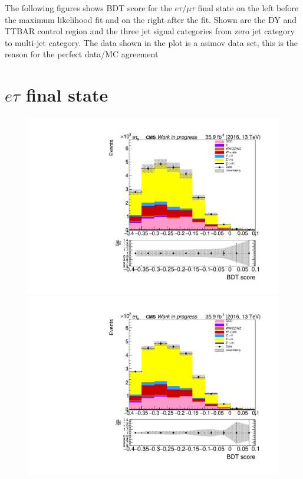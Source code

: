 \label{sec:appendix_B}

The following figures shows \gls{BDT} score for the $e\tau/\mu\tau$ final state on the left before the maximum likelihood fit and on the right after the fit. Shown are the \gls{DY} and \gls{TTBAR} control region and the three jet signal categories from zero jet category to multi-jet category. The data shown in the plot is a asimov data set, this is the reason for the perfect data/MC agreement

\section*{$e\tau$ final state}

\begin{figure}[htp]
	\begin{multicols}{2}
		\includegraphics[width=\linewidth]{plots/et/DY_CR_prefit.pdf}\par 
		\includegraphics[width=\linewidth]{plots/et/DY_CR_postfit.pdf}\par
	\end{multicols}

\end{figure}

